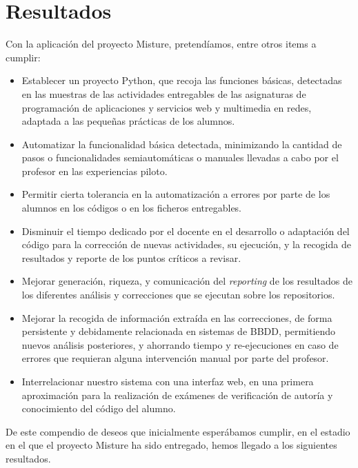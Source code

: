 \cleardoublepage
\chapter{Resultados}
\label{chap:resultados}

Con la aplicación del proyecto Misture, pretendíamos, entre otros items a cumplir:\\


\begin{itemize}
\item Establecer un proyecto Python, que recoja las funciones básicas, detectadas en las muestras de las actividades entregables de las asignaturas de programación de aplicaciones y servicios web y multimedia en redes, adaptada a las pequeñas prácticas de los alumnos.

\item Automatizar la funcionalidad básica detectada, minimizando la cantidad de pasos o funcionalidades semiautomáticas o manuales llevadas a cabo por el profesor en las experiencias piloto.

\item Permitir cierta tolerancia en la automatización a errores por parte de los alumnos en los códigos o en los ficheros entregables. 

\item Disminuir el tiempo dedicado por el docente en el desarrollo o adaptación del código para la corrección de nuevas actividades, su ejecución, y la recogida de resultados y reporte de los puntos críticos a revisar.

\item Mejorar generación, riqueza, y comunicación del \textit{reporting} de los resultados de los diferentes análisis y correcciones que se ejecutan sobre los repositorios.

\item Mejorar la recogida de información extraída en las correcciones, de forma persistente y debidamente relacionada en sistemas de BBDD, permitiendo nuevos análisis posteriores, y ahorrando tiempo y re-ejecuciones en caso de errores que requieran alguna intervención manual por parte del profesor.

\item Interrelacionar nuestro sistema con una interfaz web, en una primera aproximación para la realización de exámenes de verificación de autoría y conocimiento del código del alumno.
\end{itemize}

De este compendio de deseos que inicialmente esperábamos cumplir, en el estadio en el que el proyecto Misture ha sido entregado, hemos llegado a los siguientes resultados.\


